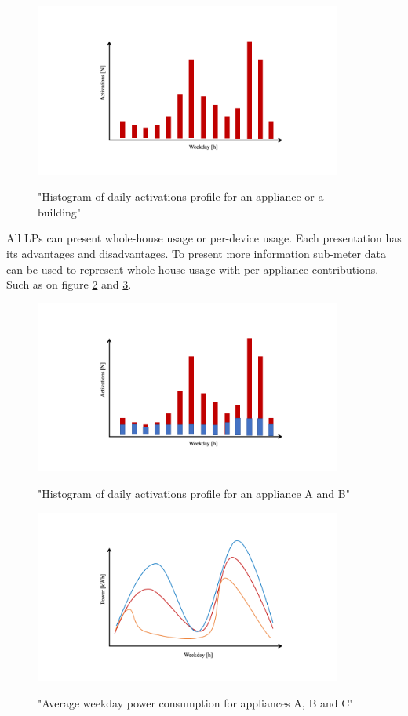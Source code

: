\begin{figure}[H]
	\centering
	\caption{"Histogram of daily activations profile for an appliance or a building"}
	\includegraphics[width=0.9\textwidth]{Figures/profile_sketches/Slide5.png}
	\label{fig:daily_act_profile}
\end{figure}

All LPs can present whole-house usage or per-device usage. Each presentation has its advantages and disadvantages. 
To present more information sub-meter data can be used to represent whole-house usage with per-appliance contributions.
Such as on figure \ref{fig:daily_act_m_profile} and \ref{fig:daily_power_m_profile}.

\begin{figure}[H]
	\centering
	\caption{"Histogram of daily activations profile for an appliance A and B"}
	\includegraphics[width=0.9\textwidth]{Figures/profile_sketches/Slide8.png}
	\label{fig:daily_act_m_profile}
\end{figure}
\begin{figure}[H]
	\centering
	\caption{"Average weekday power consumption for appliances A, B and C"}
	\includegraphics[width=0.9\textwidth]{Figures/profile_sketches/Slide2.png}
	\label{fig:daily_power_m_profile}
\end{figure}

